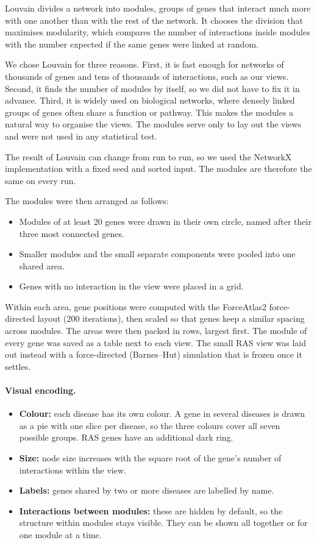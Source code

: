 \documentclass[11pt]{article}
\begin{document}
Louvain divides a network into modules, groups of genes that interact much more with one another than with the rest of the network. It chooses the division that maximises modularity, which compares the number of interactions inside modules with the number expected if the same genes were linked at random.

We chose Louvain for three reasons. First, it is fast enough for networks of thousands of genes and tens of thousands of interactions, such as our views. Second, it finds the number of modules by itself, so we did not have to fix it in advance. Third, it is widely used on biological networks, where densely linked groups of genes often share a function or pathway. This makes the modules a natural way to organise the views. The modules serve only to lay out the views and were not used in any statistical test.

The result of Louvain can change from run to run, so we used the NetworkX implementation with a fixed seed and sorted input. The modules are therefore the same on every run.

The modules were then arranged as follows:

\begin{itemize}
  \item Modules of at least 20 genes were drawn in their own circle, named after their three most connected genes.
  \item Smaller modules and the small separate components were pooled into one shared area.
  \item Genes with no interaction in the view were placed in a grid.
\end{itemize}

Within each area, gene positions were computed with the ForceAtlas2 force-directed layout (200 iterations), then scaled so that genes keep a similar spacing across modules. The areas were then packed in rows, largest first. The module of every gene was saved as a table next to each view. The small RAS view was laid out instead with a force-directed (Barnes--Hut) simulation that is frozen once it settles.

\paragraph{Visual encoding.}

\begin{itemize}
  \item \textbf{Colour:} each disease has its own colour. A gene in several diseases is drawn as a pie with one slice per disease, so the three colours cover all seven possible groups. RAS genes have an additional dark ring.
  \item \textbf{Size:} node size increases with the square root of the gene's number of interactions within the view.
  \item \textbf{Labels:} genes shared by two or more diseases are labelled by name.
  \item \textbf{Interactions between modules:} these are hidden by default, so the structure within modules stays visible. They can be shown all together or for one module at a time.
\end{itemize}
\end{document}

